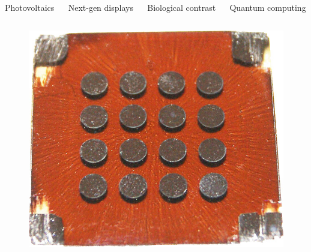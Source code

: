 \documentclass[aspectratio=169]{beamer}
\begin{document}
\begin{frame}
  \vspace{-1cm}
  \begin{columns}
    \begin{column}{0.25\textwidth}
      \begin{center}
        Photovoltaics
      \end{center}
    \end{column}

    \begin{column}{0.25\textwidth}
      \begin{center}
        Next-gen displays
      \end{center}
    \end{column}

    \begin{column}{0.25\textwidth}
      \begin{center}
        Biological contrast
      \end{center}
    \end{column}

    \begin{column}{0.25\textwidth}
      \begin{center}
        Quantum computing
      \end{center}
    \end{column}

  \end{columns}

  \begin{columns}
    \begin{column}{0.25\textwidth}
      \begin{figure}
        \includegraphics[width=\textwidth]{figures/devices/quantum_dot_solar_cell.jpg}
      \end{figure}
    \end{column}


\end{columns}
\end{frame}
\end{document}
